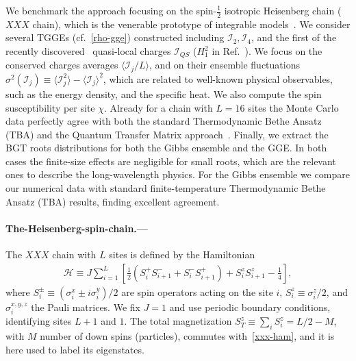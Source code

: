 \documentclass[twocolumn,superscriptaddress,prb,10pt]{revtex4-1}
\begin{document}
We benchmark the approach focusing on the spin-$\frac{1}{2}$ isotropic 
Heisenberg chain ($XXX$ chain), which is the venerable prototype of integrable 
models~\cite{bethe-1931}. We consider several TGGEs 
(cf.~\eqref{rho-gge}) constructed including ${\mathcal I}_2,{\mathcal I}_4$, and the 
first of the recently discovered~\cite{ilievski-2015,ilievski-2015a} 
quasi-local charges ${\mathcal I}_{QS}$ ($H_1^2$ in Ref.~). 
We focus on the conserved charges averages $\langle{\mathcal I}_j/L\rangle$, 
and on their ensemble fluctuations $\sigma^2({\mathcal I}_j)\equiv\langle{\mathcal I}_j^2
\rangle-\langle{\mathcal I}_j\rangle^2$, which  are related to well-known physical 
observables, such as the energy density, and the specific heat. We also compute the spin susceptibility 
per site $\chi$. Already for a chain with $L=16$ sites the Monte Carlo data perfectly agree 
with both the standard Thermodynamic Bethe Ansatz~\cite{mossel-2012} (TBA) and the Quantum Transfer 
Matrix approach~\cite{fagotti-2013a,pozsgay-2013}. 
Finally, we extract the BGT roots distributions for both the Gibbs ensemble and the GGE. 
In both cases the finite-size effects are negligible for small roots, which are the 
relevant ones to describe the long-wavelength physics. For the Gibbs ensemble we compare 
our numerical data with standard finite-temperature Thermodynamic Bethe Ansatz (TBA) results, 
finding excellent agreement. 


\paragraph*{The-Heisenberg-spin-chain.---}

The $XXX$ chain with $L$ sites is defined by the Hamiltonian 
%
\begin{align}
\label{xxx-ham}
{\mathcal H}\equiv J\sum\limits_{i=1}^L\left[\frac{1}{2}(S_i^+S^-_{i+1} 
+S_i^{-}S_{i+1}^+)+S_i^zS_{i+1}^z-\frac{1}{4}\right],  
\end{align}
%
where $S^{\pm}_i\equiv (\sigma_i^x\pm i\sigma_i^y)/2$ are spin operators acting on the 
site $i$, $S_i^z\equiv\sigma_i^z/2$, and $\sigma^{x,y,z}_i$ the Pauli matrices. We fix 
$J=1$ and use periodic boundary conditions, identifying sites $L+1$ and $1$. The total 
magnetization $S_{T}^z\equiv\sum_iS_i^z=L/2-M$, with $M$ number of down spins (particles), 
commutes with~\eqref{xxx-ham}, and it is here used to label its eigenstates. 
\end{document}
